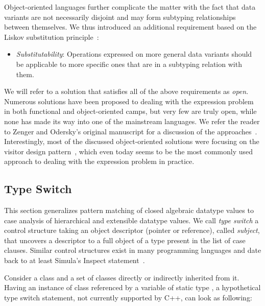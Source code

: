 \noindent
Object-oriented languages further complicate the matter with the fact that 
data variants are not necessarily disjoint and may form subtyping relationships  
between themselves. We thus introduced an additional requirement based on the
Liskov substitution principle~\cite{Lis87}:

\begin{itemize}
\setlength{\itemsep}{0pt}
\setlength{\parskip}{0pt}
\item \emph{Substitutability}: Operations expressed on more general data variants
      should be applicable to more specific ones that are in a subtyping relation 
      with them.
\end{itemize}


\noindent
We will refer to a solution that satisfies all of the above requirements as \emph{open}. 
Numerous solutions have been proposed to dealing with the expression problem in both 
functional and object-oriented camps, but very few are truly open, while 
none has made its way into one of the mainstream languages. We refer the reader 
to Zenger and Odersky's original manuscript for a discussion of the 
approaches~\cite{fool12}. Interestingly, most of the discussed object-oriented 
solutions were focusing on the visitor design pattern~\cite{DesignPatterns1993}, 
which even today seems to be the most commonly used approach to dealing with the 
expression problem in practice.

\subsection{Type Switch}

This section generalizes pattern matching of closed algebraic datatype values
to case analysis of hierarchical and extensible datatype values.
We call \emph{type switch} a control structure taking an object
descriptor (pointer or reference), called \emph{subject}, that uncovers a 
descriptor to a full object of a type present in the list of case 
clauses. Similar control structures exist in many programming languages and 
date back to at least Simula's Inspect statement~\cite{Simula67}.

Consider a class  and a set of classes  directly 
or indirectly inherited from it. Having an instance of class  referenced 
by a variable  of static type , a hypothetical type switch 
statement, not currently supported by C++, can look as following:

